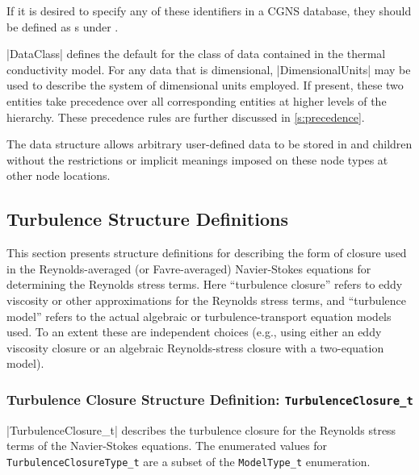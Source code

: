 If it is desired to specify any of these identifiers in a CGNS
database, they should be defined as s under
.

|DataClass| defines the default for the class of data contained in the
thermal conductivity model.
For any data that is dimensional, |DimensionalUnits| may be used to
describe the system of dimensional units employed.
If present, these two entities take precedence over all corresponding
entities at higher levels of the hierarchy.
These precedence rules are further discussed in \autoref{s:precedence}.

The  data structure allows arbitrary
user-defined data to be stored in  and
 children without the restrictions or implicit
meanings imposed on these node types at other node locations.

\subsection{Turbulence Structure Definitions}

This section presents structure definitions for describing the form of
closure used in the Reynolds-averaged (or Favre-averaged) Navier-Stokes
equations for determining the Reynolds stress terms.  Here ``turbulence
closure'' refers to eddy viscosity or other approximations for the
Reynolds stress terms, and ``turbulence model'' refers to the actual
algebraic or turbulence-transport equation models used.  To an extent
these are independent choices (e.g., using either an eddy viscosity
closure or an algebraic Reynolds-stress closure with a two-equation
model).

\subsubsection{Turbulence Closure Structure Definition: \texttt{TurbulenceClosure\_t}}

|TurbulenceClosure_t| describes the turbulence closure for the Reynolds
stress terms of the Navier-Stokes equations.
The enumerated values for \texttt{TurbulenceClosureType\_t} are a subset of the
\texttt{ModelType\_t} enumeration.

